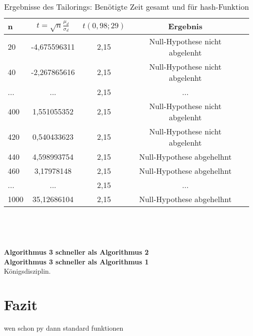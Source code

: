 \documentclass[
10pt, %
a4paper, %
oneside, %
headinclude,footinclude, %
BCOR5mm, %
]{scrartcl}
\begin{document}
\begin{table}[h!]
	\centering 
	\begin{tabular}{|l|c|c|c|c|}
	\hline
				n   &		\(t=\sqrt{n}\frac{\mu_d}{\sigma_d} \)				& \(t(0,98;29)\) &	Ergebnis\\
	\hline
	20   	&	-4,675596311	& 2,15 &	Null-Hypothese nicht abgelenht\\
	\hline
	40   	&	-2,267865616	& 2,15 &	Null-Hypothese nicht abgelenht\\
	\hline
	...   &		...			  & 2,15 &		...\\
	\hline
	400   &		1,551055352   &	 2,15 &	Null-Hypothese nicht abgelenht\\
	\hline
	420   &		0,540433623   &	 2,15 &	Null-Hypothese nicht abgelenht\\
	\hline
	440   &		4,598993754   &	 2,15 &	Null-Hypothese abgehelhnt\\
	\hline
	460   &		3,17978148    &	 2,15 &	Null-Hypothese abgehelhnt\\
	\hline
	...   &		...			  &	 2,15 &	...\\
	\hline
	1000   &		35,12686104	&  2,15 &	Null-Hypothese abgehelhnt\\
	\hline
	\end{tabular}\\
	\caption[Ergebnisse Tailoring]{Ergebnisse des Tailorings: Benötigte Zeit gesamt und für hash-Funktion}
\end{table}\

\textbf{Algorithmus 3 schneller als Algorithmus 2}\\


\textbf{Algorithmus 3 schneller als Algorithmus 1}\\
Königsdisziplin.



\section{Fazit}

wen schon py dann standard funktionen



\renewcommand{\refname}{\spacedlowsmallcaps{Literatur/Quellen}} %




\end{document}
